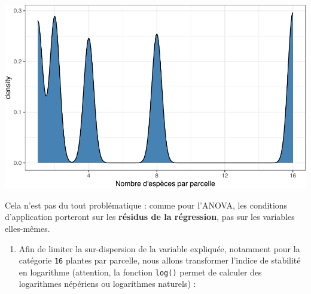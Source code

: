 \documentclass[
  a4paper,
]{article}
\newenvironment{Shaded}{\begin{snugshade}}{\end{snugshade}}
\newcommand{\DataTypeTok}[1]{\textcolor[rgb]{0.00,0.34,0.68}{#1}}
\newcommand{\FloatTok}[1]{\textcolor[rgb]{0.69,0.50,0.00}{#1}}
\newcommand{\KeywordTok}[1]{\textcolor[rgb]{0.12,0.11,0.11}{\textbf{#1}}}
\newcommand{\NormalTok}[1]{\textcolor[rgb]{0.12,0.11,0.11}{#1}}
\newcommand{\OperatorTok}[1]{\textcolor[rgb]{0.12,0.11,0.11}{#1}}
\newcommand{\StringTok}[1]{\textcolor[rgb]{0.75,0.01,0.01}{#1}}
\providecommand{\tightlist}{%
  \setlength{\itemsep}{0pt}\setlength{\parskip}{0pt}}
\begin{document}
\begin{Shaded}
\end{Shaded}

\begin{center}\includegraphics[width=0.9\linewidth]{figure/unnamed-chunk-115-1} \end{center}

Cela n'est pas du tout problématique : comme pour l'ANOVA, les conditions d'application porteront sur les \textbf{résidus de la régression}, pas sur les variables elles-mêmes.

\begin{enumerate}
\def\labelenumi{\arabic{enumi}.}
\setcounter{enumi}{1}
\tightlist
\item
  Afin de limiter la sur-dispersion de la variable expliquée, notamment pour la catégorie \texttt{16} plantes par parcelle, nous allons transformer l'indice de stabilité en logarithme (attention, la fonction \texttt{log()} permet de calculer des logarithmes népériens ou logarithmes naturels) :
\end{enumerate}

\begin{Shaded}
\end{Shaded}
\end{document}
